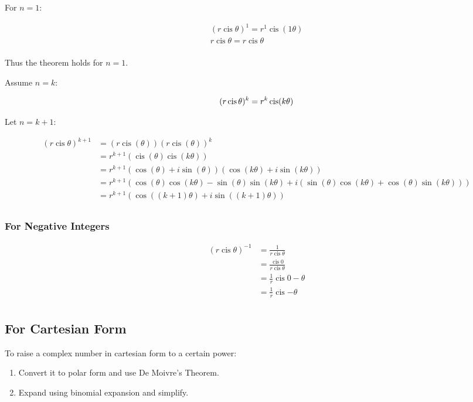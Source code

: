 \documentclass[a4paper,11pt]{article}
\DeclareMathOperator\cis{cis}
\begin{document}
For $n = 1$:

$$
\begin{aligned}
(r \cis{\theta})^1 = r^1 \cis(1 \theta) \\
r \cis{\theta} = r \cis{\theta} \\
\end{aligned}
$$

Thus the theorem holds for $n = 1$.

Assume $n = k$:

$$
(r \cis{\theta})^k = r^k \cis(k \theta) \\
$$

Let $n = k + 1$:

$$
\begin{aligned}
(r \cis{\theta})^{k + 1} & = (r \cis(\theta))(r \cis(\theta))^k \\
& = r^{k + 1} (\cis(\theta) \cis(k \theta)) \\
& = r^{k + 1} (\cos(\theta) + i \sin(\theta))(\cos(k \theta) + i \sin(k \theta)) \\
& = r^{k + 1} (\cos(\theta) \cos(k \theta) - \sin(\theta) \sin(k \theta) + i(\sin(\theta) \cos(k \theta) + \cos(\theta) \sin(k \theta))) \\
& = r^{k + 1} (\cos((k + 1) \theta) + i \sin((k + 1) \theta)) \\
\end{aligned}
$$


\subsubsection{For Negative Integers}

$$
\begin{aligned}
(r \cis{\theta})^{-1} & = \frac{1}{r \cis{\theta}} \\
& = \frac{\cis{0}}{r \cis{\theta}} \\
& = \frac{1}{r} \cis{0 - \theta} \\
& = \frac{1}{r} \cis{-\theta} \\
\end{aligned}
$$


\subsection{For Cartesian Form}

To raise a complex number in cartesian form to a certain power:

\begin{enumerate}
\item Convert it to polar form and use De Moivre's Theorem.
\item Expand using binomial expansion and simplify.
\end{enumerate}
\end{document}
